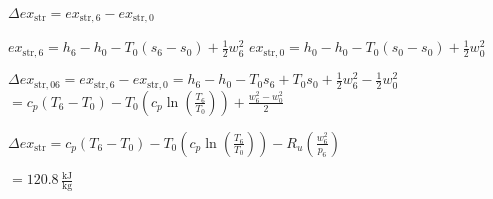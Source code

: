 \( \Delta ex_{\text{str}} = ex_{\text{str},6} - ex_{\text{str},0} \)  

\( ex_{\text{str},6} = h_6 - h_0 - T_0 (s_6 - s_0) + \frac{1}{2} w_6^2 \)  
\( ex_{\text{str},0} = h_0 - h_0 - T_0 (s_0 - s_0) + \frac{1}{2} w_0^2 \)  

\( \Delta ex_{\text{str},06} = ex_{\text{str},6} - ex_{\text{str},0} = h_6 - h_0 - T_0 s_6 + T_0 s_0 + \frac{1}{2} w_6^2 - \frac{1}{2} w_0^2 \)  
\( = c_p (T_6 - T_0) - T_0 \left( c_p \ln \left( \frac{T_6}{T_0} \right) \right) + \frac{w_6^2 - w_0^2}{2} \)  

\( \Delta ex_{\text{str}} = c_p (T_6 - T_0) - T_0 \left( c_p \ln \left( \frac{T_6}{T_0} \right) \right) - R_u \left( \frac{w_6^2}{p_6} \right) \)  

\( = 120.8 \, \frac{\text{kJ}}{\text{kg}} \)
